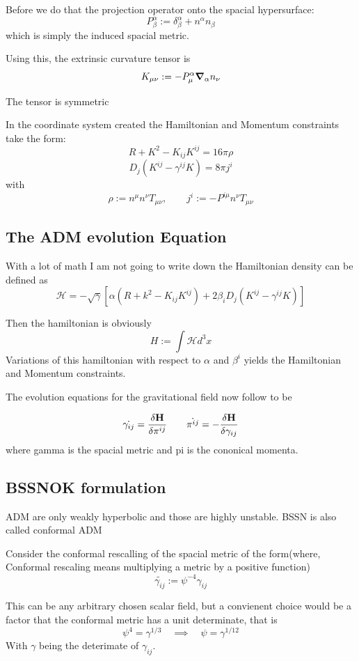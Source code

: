 Before we do that the projection operator onto the spacial hypersurface:
\[
P^\alpha_\beta := \delta^\alpha_\beta + n^\alpha n_\beta
  \]
  which is simply the induced spacial metric.

  Using this, the extrinsic curvature tensor is
\[
K_{\mu \nu} := -P^\alpha_\mu \grad_\alpha n_\nu
  \]

  The tensor is symmetric

  In the coordinate system created the Hamiltonian and Momentum constraints take the form:
\[
R + K^2 - K_{ij}K^{ij} = 16 \pi \rho
  \]
\[
D_j(K^{ij}- \gamma^{ij}K) = 8 \pi j^i
  \]
  with
\[
\rho := n^\mu n^\nu T_{\mu \nu}, \qquad j^i := -P^{i\mu}n^\nu T_{\mu \nu}
  \]

\subsection{The ADM evolution Equation}

With a lot of math I am not going to write down the Hamiltonian density can be defined as
\[
\mathcal{H} = - \sqrt{\gamma} \left[\alpha (R+k^2 -K_{ij}K^{ij}) + 2 \beta_i D_j (K^{ij} - \gamma^{ij} K)  \right]
  \]

  Then the hamiltonian is obviously
\[
H := \int \mathcal{H} d^3x
  \]
  Variations of this hamiltonian with respect to $\alpha$ and $\beta^i$ yields the Hamiltonian and Momentum constraints.

The evolution equations for the gravitational field now follow to be

\[
\dot{\gamma_{ij}} = \fdv{\mathbf{H}}{\pi^{ij}} \qquad \dot{\pi^{ij}} = - \fdv{\mathbf{H}}{\gamma_{ij}}
  \]
  where gamma is the spacial metric and pi is the cononical momenta.


\subsection{BSSNOK formulation}

ADM are only weakly hyperbolic and those are highly unstable. BSSN is also called conformal ADM

Consider the conformal rescalling of the spacial metric of the form(where, Conformal rescaling means multiplying a metric by a positive function)
\[
\tilde{\gamma_{ij}} := \psi^{-4} \gamma_{ij}
  \]

  This can be any arbitrary chosen scalar field, but a convienent choice would be a factor that the conformal metric has a unit determinate, that is
\[
\psi^4 = \gamma^{1/3} \quad \implies \quad \psi = \gamma^{1/12}
  \]
  With $\gamma$ being the deterimate of $\gamma_{ij}$.

